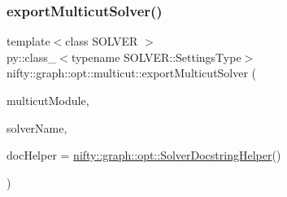 \subsubsection{\texorpdfstring{export\+Multicut\+Solver()}{exportMulticutSolver()}}
{\footnotesize\ttfamily template$<$class S\+O\+L\+V\+ER $>$ \\
py\+::class\+\_\+$<$typename S\+O\+L\+V\+E\+R\+::\+Settings\+Type$>$ nifty\+::graph\+::opt\+::multicut\+::export\+Multicut\+Solver (\begin{DoxyParamCaption}\item[{py\+::module \&}]{multicut\+Module,  }\item[{const std\+::string \&}]{solver\+Name,  }\item[{\hyperlink{classnifty_1_1graph_1_1opt_1_1SolverDocstringHelper}{nifty\+::graph\+::opt\+::\+Solver\+Docstring\+Helper}}]{doc\+Helper = {\ttfamily \hyperlink{classnifty_1_1graph_1_1opt_1_1SolverDocstringHelper}{nifty\+::graph\+::opt\+::\+Solver\+Docstring\+Helper}()} }\end{DoxyParamCaption})}

